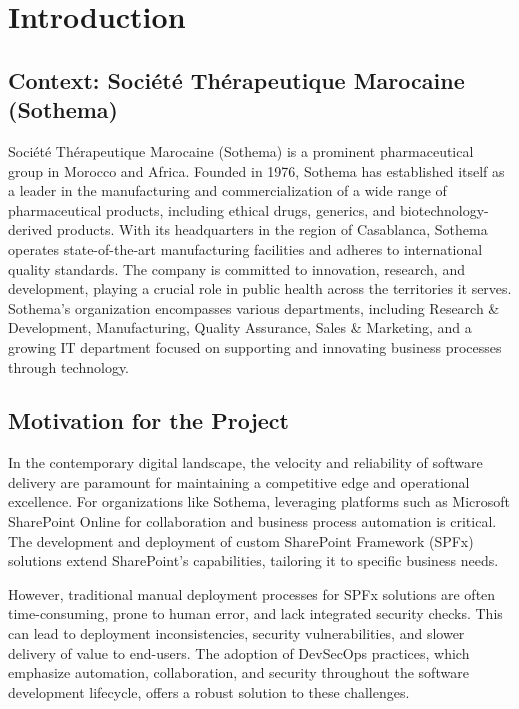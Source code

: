 \chapter*{Introduction}
\label{introduction}

\section{Context: Société Thérapeutique Marocaine (Sothema)}
\label{sec:intro_context}

Société Thérapeutique Marocaine (Sothema) is a prominent pharmaceutical group in Morocco and Africa. Founded in 1976, Sothema has established itself as a leader in the manufacturing and commercialization of a wide range of pharmaceutical products, including ethical drugs, generics, and biotechnology-derived products. With its headquarters in the region of Casablanca, Sothema operates state-of-the-art manufacturing facilities and adheres to international quality standards. The company is committed to innovation, research, and development, playing a crucial role in public health across the territories it serves. Sothema's organization encompasses various departments, including Research \& Development, Manufacturing, Quality Assurance, Sales \& Marketing, and a growing IT department focused on supporting and innovating business processes through technology.

\section{Motivation for the Project}
\label{sec:intro_motivation}

In the contemporary digital landscape, the velocity and reliability of software delivery are paramount for maintaining a competitive edge and operational excellence. For organizations like Sothema, leveraging platforms such as Microsoft SharePoint Online for collaboration and business process automation is critical. The development and deployment of custom SharePoint Framework (SPFx) solutions extend SharePoint's capabilities, tailoring it to specific business needs.

However, traditional manual deployment processes for SPFx solutions are often time-consuming, prone to human error, and lack integrated security checks. This can lead to deployment inconsistencies, security vulnerabilities, and slower delivery of value to end-users. The adoption of DevSecOps practices, which emphasize automation, collaboration, and security throughout the software development lifecycle, offers a robust solution to these challenges.

